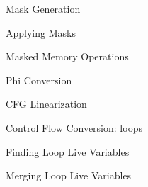 \begin{frame}{Mask Generation}

\end{frame}


\begin{frame}{Applying Masks}

\end{frame}


\begin{frame}{Masked Memory Operations}

\end{frame}


\begin{frame}{Phi Conversion}

\end{frame}


\begin{frame}{CFG Linearization}

\end{frame}


\begin{frame}{Control Flow Conversion: loops}

\end{frame}


\begin{frame}{Finding Loop Live Variables}

\end{frame}


\begin{frame}{Merging Loop Live Variables}

\end{frame}
